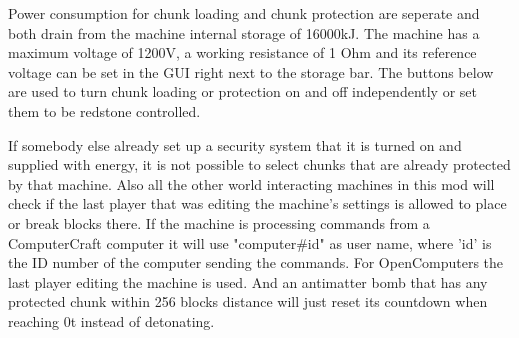 \documentclass[11pt]{article} %
\begin{document}
Power consumption for chunk loading and chunk protection are seperate and both drain from the machine internal storage of 16000kJ. The machine has a maximum voltage of 1200V, a working resistance of 1 Ohm and its reference voltage can be set in the GUI right next to the storage bar. The buttons below are used to turn chunk loading or protection on and off independently or set them to be redstone controlled.

If somebody else already set up a security system that it is turned on and supplied with energy, it is not possible to select chunks that are already protected by that machine. Also all the other world interacting machines in this mod will check if the last player that was editing the machine's settings is allowed to place or break blocks there. If the machine is processing commands from a ComputerCraft computer it will use "computer\#id" as user name, where 'id' is the ID number of the computer sending the commands. For OpenComputers the last player editing the machine is used. And an antimatter bomb that has any protected chunk within 256 blocks distance will just reset its countdown when reaching 0t instead of detonating.
\end{document}
